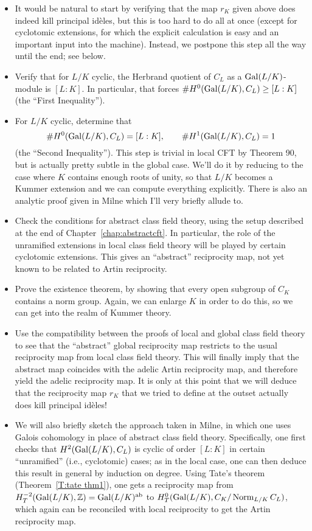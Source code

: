 \begin{itemize}
\item 
It would be natural to start by verifying
that the map $r_K$ given above does indeed kill principal id\`eles,
but this is too hard to do all at once (except for cyclotomic extensions, for which the explicit calculation is easy and an important input into the machine). Instead, we postpone this step all the way until the end; see below.
\item Verify that for $L/K$ cyclic, the Herbrand quotient of
$C_L$ as a $\operatorname{Gal}(L/K)$-module is $[L:K]$. In particular,
that forces $\#H^0(\operatorname{Gal}(L/K), C_L) \geq [L:K]$ (the ``First Inequality'').
\item
For $L/K$ cyclic, determine that
\[
\#H^0(\operatorname{Gal}(L/K), C_L) = [L:K], \qquad \#H^1(\operatorname{Gal}(L/K), C_L) = 1
\]
(the ``Second Inequality''). This step is trivial in local CFT by
Theorem 90, but is actually pretty subtle in the global case. We'll
do it by reducing to the case where $K$ contains enough roots of unity,
so that $L/K$ becomes a Kummer extension and we can compute everything
explicitly. There is also an analytic proof given in Milne which I'll
very briefly allude to.
\item
Check the conditions for abstract class field theory, using the setup described at the end of Chapter~\ref{chap:abstractcft}. In particular, the role of the unramified extensions in local class field theory will be played by certain cyclotomic extensions.
This gives an ``abstract'' reciprocity map, not yet known to be related to Artin reciprocity.
\item
Prove the existence theorem, by showing that every open subgroup
of $C_K$ contains a norm group. Again, we can enlarge $K$ in order
to do this, so we can get into the realm of Kummer theory.
\item
Use the compatibility between the proofs of local and global class field theory to see that the ``abstract'' global reciprocity map restricts to the usual reciprocity map from local class field theory. This will finally imply that the abstract map coincides with the adelic Artin reciprocity map, and therefore yield the adelic reciprocity map. It is only at this point that we will deduce that the reciprocity map $r_K$ that we tried to define at the outset
actually does kill principal id\`eles!

\item
We will also briefly sketch the approach taken in Milne, in which one uses Galois cohomology in place of abstract class field theory.
 Specifically, one first checks that
 $H^2(\operatorname{Gal}(L/K), C_L)$ is cyclic of order $[L:K]$ in certain ``unramified'' (i.e., cyclotomic) cases; as in the local case, one can then deduce this result in general by induction on degree. Using Tate's theorem (Theorem~\ref{T:tate thm1}),
one gets a reciprocity map from $H^{-2}_T(\operatorname{Gal}(L/K), \mathbb{Z}) = \operatorname{Gal}(L/K)^{\operatorname{ab}}$
to $H^0_T(\operatorname{Gal}(L/K), C_K/\operatorname{Norm}_{L/K} C_L)$, which again can be reconciled with local reciprocity to get the Artin reciprocity map. 
\end{itemize}


%
